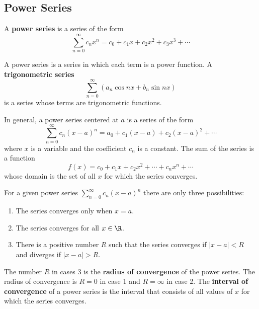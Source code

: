 \subsection{Power Series}

A \textbf{power series} is a series of the form
\[\sum_{n=0}^\infty c_n x^n=c_0+c_1 x +c_2 x^2+c_3 x^3+\cdots\]

A power series is a series in which each term is a power function.
A \textbf{trigonometric series}
\[\sum_{n=0}^\infty(a_n\cos nx+b_n\sin nx)\]
is a series whose terms are trigonometric functions.

In general, a power series centered at \(a\) is a series of the form
\[\sum_{n=0}^{\infty}c_n(x-a)^n=a_0+c_1(x-a)+c_2(x-a)^2+\cdots\]
where \(x\) is a variable and the coefficient \(c_n\) is a constant.
The sum of the series is a function
\[f(x)=c_0+c_1x+c_2x^2+\cdots+c_nx^n+\cdots\]
whose domain is the set of all \(x\) for which the series converges.
\begin{theorem}
    For a given power series
    \(\displaystyle{\sum_{n=0}^\infty c_n(x-a)^n}\) there are only three
    possibilities:
    \begin{enumerate}
        \item The series converges only when \(x=a\).
        \item The series converges for all \(x\in\R\).
        \item There is a positive number \(R\) such that the series converges
        if \(|x-a|<R\) and diverges if \(|x-a|>R\).
    \end{enumerate}
\end{theorem}
The number \(R\) in cases 3 is the \textbf{radius of convergence} of the power
series.
The radius of convergence is \(R=0\) in case 1 and \(R=\infty\) in case 2.
The \textbf{interval of convergence} of a power series is the interval that
consists of all values of \(x\) for which the series converges.